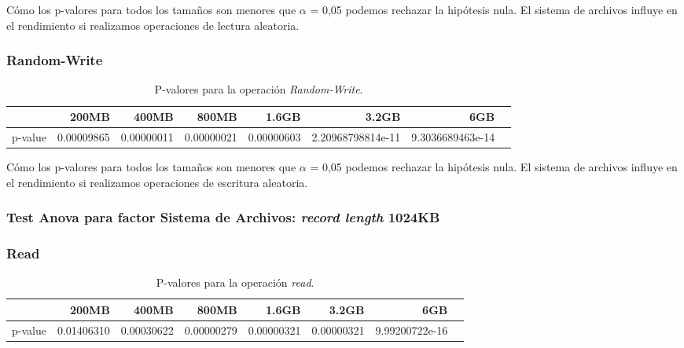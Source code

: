  Cómo los p-valores para todos los tamaños son menores que $\alpha$ = 0,05 podemos rechazar la hipótesis nula. El sistema de archivos influye en el rendimiento si realizamos operaciones de lectura aleatoria. 

\subsubsection{Random-Write}
\begin{table}[!htp]\centering
\scriptsize
\begin{tabular}{lrrrrrrr}\toprule
&200MB &400MB &800MB &1.6GB &3.2GB &6GB \\\midrule
p-value &0.00009865 &0.00000011 &0.00000021 &0.00000603 &2.20968798814e-11 &9.3036689463e-14 \\
\bottomrule
\end{tabular}
\caption{P-valores para la operación \textit{Random-Write}.}\label{tab: }
\end{table}

Cómo los p-valores para todos los tamaños son menores que $\alpha$ = 0,05 podemos rechazar la hipótesis nula. El sistema de archivos influye en el rendimiento si realizamos operaciones de escritura aleatoria. 













\newpage
\subsubsection{Test Anova para factor Sistema de Archivos: \textit{record length} 1024KB}

\subsubsection{Read}
\begin{table}[!htp]\centering
\scriptsize
\begin{tabular}{lrrrrrrr}\toprule
&200MB &400MB &800MB &1.6GB &3.2GB &6GB \\\midrule
p-value &0.01406310 &0.00030622 &0.00000279 &0.00000321 &0.00000321 &9.99200722e-16 \\
\bottomrule
\end{tabular}
\caption{P-valores para la operación \textit{read}.}\label{tab: }
\end{table}

